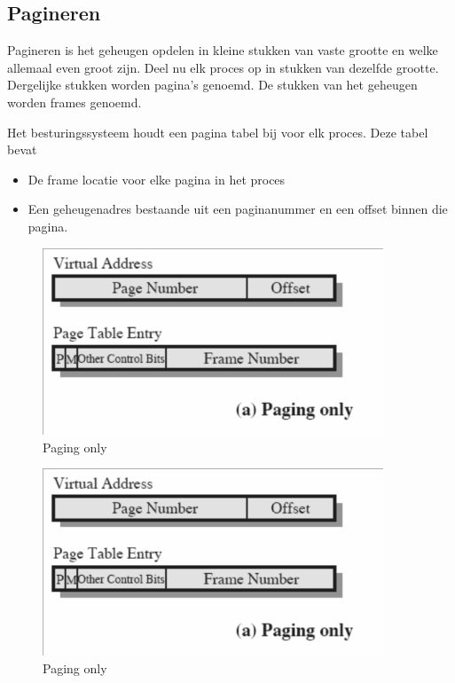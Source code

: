 \subsection{Pagineren}

Pagineren is het geheugen opdelen in kleine stukken van vaste grootte en welke allemaal even groot zijn. Deel nu elk proces op in stukken van dezelfde grootte. Dergelijke stukken worden pagina’s genoemd. De stukken van het geheugen worden frames genoemd.

Het besturingssysteem houdt een pagina tabel bij voor elk proces. Deze tabel bevat

\begin{itemize}
\item De frame locatie voor elke pagina in het proces
\item Een geheugenadres bestaande uit een paginanummer en een offset binnen die pagina.
\end{itemize}


\begin{figure}[htp]
    \centering
            \includegraphics[width=4in]{img/pagineren.png}
        \caption{Paging only}
    \label{fig:Paging only}
\end{figure}


\begin{figure}[htp]
    \centering
            \includegraphics[width=4in]{img/pagineren.png}
        \caption{Paging only}
    \label{fig:Paging only}
\end{figure}

